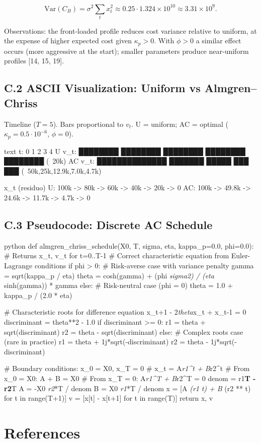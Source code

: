 \documentclass[11pt,a4paper]{article}
\begin{document}
\begin{equation}
\mathrm{Var}(C_B) = \sigma^2\sum_t x_t^2 \approx 0.25\cdot 1.324\times 10^{10} \approx 3.31\times 10^9.
\end{equation}

Observations: the front‑loaded profile reduces cost variance relative to uniform, at the expense of higher expected cost given $\kappa_p>0$. With $\phi>0$ a similar effect occurs (more aggressive at the start); smaller parameters produce near‑uniform profiles [14, 15, 19].

\subsection{C.2 ASCII Visualization: Uniform vs Almgren–Chriss}

Timeline ($T=5$). Bars proportional to $v_t$. U = uniform; AC = optimal ($\kappa_p=0.5\cdot 10^{-6}$, $\phi=0$).

text
t:      0        1        2        3        4
U v_t:  ████████ ████████ ████████ ████████ ████████  (~20k)
AC v\_t: ██████████████ ███████ █████ ███ ███          (~50k,25k,12.9k,7.0k,4.7k)

x\_t (residuo)
U:      100k -> 80k -> 60k -> 40k -> 20k -> 0
AC:     100k -> 49.8k -> 24.6k -> 11.7k -> 4.7k -> 0


\subsection{C.3 Pseudocode: Discrete AC Schedule}

python
def almgren\_chriss\_schedule(X0, T, sigma, eta, kappa\_p=0.0, phi=0.0):
    \# Returns x\_t, v\_t for t=0..T-1
    \# Correct characteristic equation from Euler-Lagrange conditions
    if phi > 0:
        \# Risk-averse case with variance penalty
        gamma = sqrt(kappa\_p / eta)  
        theta = cosh(gamma) + (phi \textit{ sigma}\textit{2) / (eta } sinh(gamma)) * gamma
    else:
        \# Risk-neutral case (phi = 0)
        theta = 1.0 + kappa\_p / (2.0 * eta)
    
    \# Characteristic roots for difference equation x\_{t+1} - 2\textit{theta}x\_t + x\_{t-1} = 0
    discriminant = theta**2 - 1.0
    if discriminant >= 0:
        r1 = theta + sqrt(discriminant) 
        r2 = theta - sqrt(discriminant)
    else:
        \# Complex roots case (rare in practice)
        r1 = theta + 1j*sqrt(-discriminant)
        r2 = theta - 1j*sqrt(-discriminant)
    
    \# Boundary conditions: x\_0 = X0, x\_T = 0
    \# x\_t = A\textit{r1^t + B}r2^t
    \# From x\_0 = X0: A + B = X0
    \# From x\_T = 0:  A\textit{r1^T + B}r2^T = 0
    denom = r1\textbf{T - r2}T
    A = -X0 \textit{ r2}*T / denom
    B = X0 \textit{ r1}*T / denom
    x = [A \textit{ (r1 }\textit{ t) + B } (r2 ** t) for t in range(T+1)]
    v = [x[t] - x[t+1] for t in range(T)]
    return x, v


\section{References}

\end{document}
